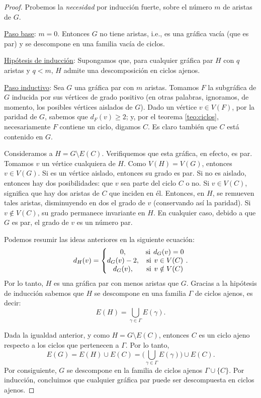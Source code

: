 \begin{proof}
Probemos la \textit{necesidad} por inducción fuerte, sobre el número $m$ de aristas de $G$. 

\underline{Paso base}: $m=0$. Entonces $G$ no tiene aristas, i.e., es una gráfica vacía (que es par) y se descompone en una familia vacía de ciclos.

\underline{Hipótesis de inducción}: Supongamos que, para cualquier gráfica par $H$ con $q$ aristas y $q < m$, $H$ admite una descomposición en ciclos ajenos.

\underline{Paso inductivo}: Sea $G$ una gráfica par con $m$ aristas. Tomamos $F$ la subgráfica de $G$ inducida por sus vértices de grado positivo (en otras palabras, ignoramos, de momento, los posibles vértices aislados de $G$). Dado un vértice $v \in V(F)$, por la paridad de $G$, sabemos que $d_{F}(v)\geq 2$; y, por el teorema \ref{teo:ciclos}, necesariamente $F$ contiene un ciclo, digamos $C$. Es claro también que $C$ está contenido en $G$.

Consideramos a $H = G \setminus E(C)$. Verifiquemos que esta gráfica, en efecto, es par. Tomamos $v$ un vértice cualquiera de $H$. Como $V(H) = V(G)$, entonces $v \in V(G)$. Si es un vértice aislado, entonces su grado es par. Si no es aislado, entonces hay dos posibilidades: que $v$ sea parte del ciclo $C$ o no. Si $v \in V(C)$, significa que hay dos aristas de $C$ que inciden en él. Entonces, en $H$, se remueven tales aristas, disminuyendo en dos el grado de $v$ (conservando así la paridad). Si $v \notin V(C)$, su grado permanece invariante en $H$. En cualquier caso, debido a que $G$ es par, el grado de $v$ es un número par. 

Podemos resumir las ideas anteriores en la siguiente ecuación:
$$
  d_{H}(v) = \left\{\begin{matrix}
0, & \text{si} \hspace{1.5mm} d_{G}(v)=0 \\ 
d_{G}(v)-2, & \text{si} \hspace{1.5mm} v \in V(C)     \\
d_{G}(v), & \text{si} \hspace{1.5mm} v \notin V(C)
\end{matrix}\right..
$$
Por lo tanto, $H$ es una gráfica par con menos aristas que $G$. Gracias a la hipótesis de inducción sabemos que $H$ se descompone en una familia $\Gamma$ de ciclos ajenos, es decir:
$$
E(H) = \bigcup_{\gamma \in \Gamma} E(\gamma).
$$

Dada la igualdad anterior, y como $H = G\setminus E(C)$, entonces $C$ es un ciclo ajeno respecto a los ciclos que pertenecen a $\Gamma$. Por lo tanto, 
$$
E(G) = E(H) \cup E(C) = \big( \bigcup_{\gamma \in \Gamma} E(\gamma) \big) \cup E(C). 
$$
Por consiguiente, $G$ se descompone en la familia de ciclos ajenos $\Gamma \cup \{C\}$. Por inducción, concluimos que cualquier gráfica par puede ser descompuesta en ciclos ajenos.


\end{proof}
